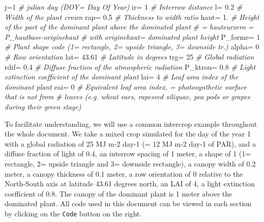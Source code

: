 \documentclass[
]{book}
\newenvironment{Shaded}{\begin{snugshade}}{\end{snugshade}}
\newcommand{\CommentTok}[1]{\textcolor[rgb]{0.56,0.35,0.01}{\textit{#1}}}
\newcommand{\DecValTok}[1]{\textcolor[rgb]{0.00,0.00,0.81}{#1}}
\newcommand{\FloatTok}[1]{\textcolor[rgb]{0.00,0.00,0.81}{#1}}
\newcommand{\NormalTok}[1]{#1}
\newcommand{\StringTok}[1]{\textcolor[rgb]{0.31,0.60,0.02}{#1}}
\begin{document}
\begin{Shaded}
\begin{Highlighting}[]
\NormalTok{j=}\DecValTok{1}              \CommentTok{# julian day (DOY= Day Of Year)}
\NormalTok{ir=}\StringTok{ }\DecValTok{1}            \CommentTok{# Interrow distance}
\NormalTok{l=}\StringTok{ }\FloatTok{0.2}           \CommentTok{# Width of the plant crown}
\NormalTok{rap=}\StringTok{ }\FloatTok{0.5}         \CommentTok{# Thickness to width ratio}
\NormalTok{haut=}\StringTok{ }\FloatTok{1.}         \CommentTok{# Height of the part of the dominant plant above the dominated plant}
                 \CommentTok{# = hauteurzero = P_hautbase-originehaut}
                 \CommentTok{# with originehaut= dominated plant height}
\NormalTok{P_forme=}\StringTok{ }\DecValTok{1}       \CommentTok{# Plant shape code (1= rectangle, 2= upside triangle, 3= downside tr.)}
\NormalTok{alpha=}\StringTok{ }\DecValTok{0}         \CommentTok{# Row orientation}
\NormalTok{lat=}\StringTok{ }\FloatTok{43.61}       \CommentTok{# Latitude in degrees}
\NormalTok{trg=}\StringTok{ }\DecValTok{25}          \CommentTok{# Global radiation}
\NormalTok{rdif=}\StringTok{ }\FloatTok{0.4}        \CommentTok{# Diffuse fraction of the atmospheric radiation}
\NormalTok{P_ktrou=}\StringTok{ }\FloatTok{0.8}     \CommentTok{# Light extinction coefficient of the dominant plant}
\NormalTok{lai=}\StringTok{ }\DecValTok{4}           \CommentTok{# Leaf area index of the dominant plant}
\NormalTok{eai=}\StringTok{ }\DecValTok{0}           \CommentTok{# Equivalent leaf area index, = photosynthetic surface that is not from}
\CommentTok{# leaves (e.g. wheat ears, rapeseed siliquae, pea pods or grapes during their green stage)}
\end{Highlighting}
\end{Shaded}

To facilitate understanding, we will use a common intercrop example throughout the whole document. We take a mixed crop simulated for the day of the year 1 with a global radiation of 25 MJ m-2 day-1 (= 12 MJ m-2 day-1 of PAR), and a diffuse fraction of light of 0.4, an interrow spacing of 1 meter, a shape of 1 (1= rectangle, 2= upside triangle and 3= downside rectangle), a canopy width of 0.2 meter, a canopy thickness of 0.1 meter, a row orientation of 0 relative to the North-South axis at latitude 43.61 degrees north, an LAI of 4, a light extinction coefficient of 0.8. The canopy of the dominant plant is 1 meter above the dominated plant.
All code used in this document can be viewed in each section by clicking on the \texttt{Code} button on the right.
\end{document}
